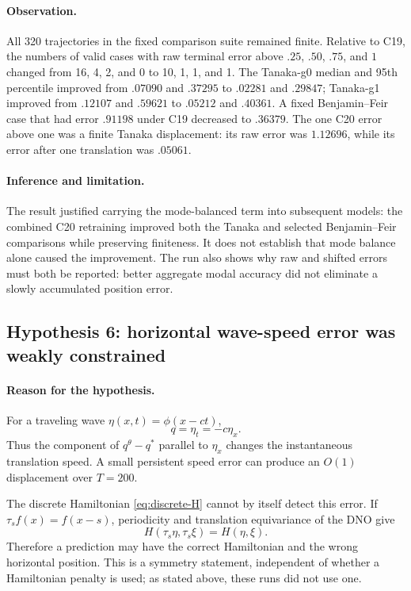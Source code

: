 \documentclass[11pt]{article}
\begin{document}
\paragraph{Observation.}
All 320 trajectories in the fixed comparison suite remained finite.  Relative
to C19, the numbers of valid cases with raw terminal error above
$.25$, $.50$, $.75$, and $1$ changed from 16, 4, 2, and 0 to 10, 1, 1, and 1.
The Tanaka-g0 median and 95th percentile improved from $.07090$ and $.37295$ to
$.02281$ and $.29847$; Tanaka-g1 improved from $.12107$ and $.59621$ to
$.05212$ and $.40361$.  A fixed Benjamin--Feir case that had error $.91198$
under C19 decreased to $.36379$.  The one C20 error above one was a finite
Tanaka displacement: its raw error was $1.12696$, while its error after one
translation was $.05061$.

\paragraph{Inference and limitation.}
The result justified carrying the mode-balanced term into subsequent models:
the combined C20 retraining improved both the Tanaka and selected
Benjamin--Feir comparisons while preserving finiteness.  It does not establish
that mode balance alone caused the improvement.  The run also shows why raw
and shifted errors must both be reported: better aggregate modal accuracy did
not eliminate a slowly accumulated position error.

\subsection{Hypothesis 6: horizontal wave-speed error was weakly constrained}

\paragraph{Reason for the hypothesis.}
For a traveling wave $\eta(x,t)=\phi(x-ct)$,
\begin{equation}
  q=\eta_t=-c\eta_x.
  \label{eq:traveling-tangent}
\end{equation}
Thus the component of $q^\theta-q^*$ parallel to $\eta_x$ changes the
instantaneous translation speed.  A small persistent speed error can produce
an $O(1)$ displacement over $T=200$.

The discrete Hamiltonian \eqref{eq:discrete-H} cannot by itself detect this
error.  If $\tau_s f(x)=f(x-s)$, periodicity and translation equivariance of
the DNO give
\begin{equation}
  H(\tau_s\eta,\tau_s\xi)=H(\eta,\xi).
  \label{eq:H-translation}
\end{equation}
Therefore a prediction may have the correct Hamiltonian and the wrong
horizontal position.  This is a symmetry statement, independent of whether a
Hamiltonian penalty is used; as stated above, these runs did not use one.
\end{document}
